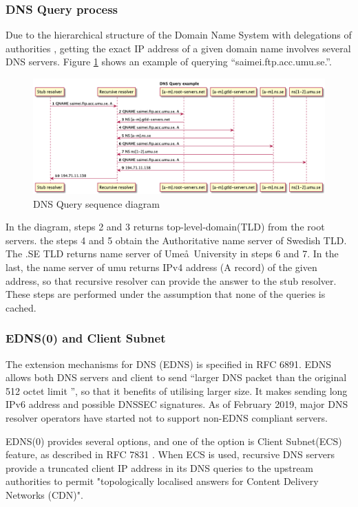 \documentclass[a4paper,12pt]{article}
\begin{document}
\subsubsection{DNS Query process}
Due to the hierarchical structure of the Domain Name System with delegations of authorities \cite{rfc1591}, getting the exact IP address of a given domain name involves several DNS servers. Figure \ref{queryprocess} shows an example of querying ``saimei.ftp.acc.umu.se.''. 
\begin{figure}[ht!]
    \begin{center}
        \includegraphics*[width=\columnwidth]{img/dnsquery}
    \end{center}
    \caption{DNS Query sequence diagram}
    \label{queryprocess}
\end{figure}
In the diagram, steps 2 and 3 returns top-level-domain(TLD) from the root servers. the steps 4 and 5 obtain the Authoritative name server of Swedish TLD. The .SE TLD returns name server of Ume\aa\ University in steps 6 and 7. In the last, the name server of umu returns IPv4 address (A record) of the given address, so that recursive resolver can provide the answer to the stub resolver. These steps are performed under the assumption that none of the queries is cached. 
\subsubsection{EDNS(0) and Client Subnet}
The extension mechanisms for DNS (EDNS) is specified in RFC 6891. EDNS allows both DNS servers and client to send ``larger DNS packet than the original 512 octet limit \cite{rfc6891}'', so that it benefits of utilising larger size. It makes sending long IPv6 address and possible DNSSEC signatures. As of February 2019, major DNS resolver operators have started not to support non-EDNS compliant servers. 

EDNS(0) provides several options, and one of the option is Client Subnet(ECS) feature, as described in RFC 7831 \cite{rfc7871}. When ECS is used, recursive DNS servers provide a truncated client IP address in its DNS queries to the upstream authorities to permit "topologically localised answers for Content Delivery Networks (CDN)\cite{kintis2016understanding}".
\end{document}
